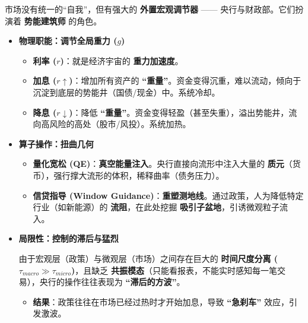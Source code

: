 市场没有统一的“自我”，但有强大的 \textbf{外置宏观调节器} —— 央行与财政部。它们扮演着 \textbf{势能建筑师} 的角色。
\begin{itemize}
    \item \textbf{\textcolor{structurecolor}{物理职能：调节全局重力 ($g$)}}
    \begin{itemize}
        \item   \textbf{利率 ($r$)}：就是经济宇宙的 \textbf{重力加速度}。
        \item   \textbf{加息 ($r \uparrow$)}：增加所有资产的 \textbf{“重量”}。资金变得沉重，难以流动，倾向于沉淀到底层的势能井（国债/现金）中。系统冷却。
        \item   \textbf{降息 ($r \downarrow$)}：降低 \textbf{“重量”}。资金变得轻盈（甚至失重），溢出势能井，流向高风险的高处（股市/风投）。系统加热。
    \end{itemize}

    \item \textbf{\textcolor{structurecolor}{算子操作：扭曲几何}}
    \begin{itemize}
        \item   \textbf{量化宽松 (QE)}：\textbf{真空能量注入}。央行直接向流形中注入大量的 \textbf{质元}（货币），强行撑大流形的体积，稀释曲率（债务压力）。
        \item   \textbf{信贷指导 (Window Guidance)}：\textbf{重塑测地线}。通过政策，人为降低特定行业（如新能源）的 \textbf{流阻}，在此处挖掘 \textbf{吸引子盆地}，引诱微观粒子流入。
    \end{itemize}

    \item \textbf{\textcolor{structurecolor}{局限性：控制的滞后与猛烈}}

    由于宏观层（政策）与微观层（市场）之间存在巨大的 \textbf{时间尺度分离 ($\tau_{macro} \gg \tau_{micro}$)}，且缺乏 \textbf{共振模态}（只能看报表，不能实时感知每一笔交易），央行的操作往往表现为 \textbf{“滞后的方波”}。
    \begin{itemize}
        \item   \textbf{结果}：政策往往在市场已经过热时才开始加息，导致 \textbf{“急刹车”} 效应，引发激波。
    \end{itemize}
\end{itemize}



